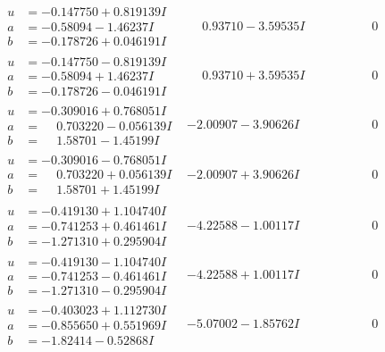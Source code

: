 \documentclass[1p]{elsarticle_modified}
\theoremstyle{definition}
\begin{document}
$$\begin{array}{c|c|c}
\begin{aligned}
u &= -0.147750 + 0.819139 I \\
a &= -0.58094 - 1.46237 I \\
b &= -0.178726 + 0.046191 I\end{aligned}
 & \phantom{-}0.93710 - 3.59535 I & \phantom{-0.000000 } 0 \\ \hline\begin{aligned}
u &= -0.147750 - 0.819139 I \\
a &= -0.58094 + 1.46237 I \\
b &= -0.178726 - 0.046191 I\end{aligned}
 & \phantom{-}0.93710 + 3.59535 I & \phantom{-0.000000 } 0 \\ \hline\begin{aligned}
u &= -0.309016 + 0.768051 I \\
a &= \phantom{-}0.703220 - 0.056139 I \\
b &= \phantom{-}1.58701 - 1.45199 I\end{aligned}
 & -2.00907 - 3.90626 I & \phantom{-0.000000 } 0 \\ \hline\begin{aligned}
u &= -0.309016 - 0.768051 I \\
a &= \phantom{-}0.703220 + 0.056139 I \\
b &= \phantom{-}1.58701 + 1.45199 I\end{aligned}
 & -2.00907 + 3.90626 I & \phantom{-0.000000 } 0 \\ \hline\begin{aligned}
u &= -0.419130 + 1.104740 I \\
a &= -0.741253 + 0.461461 I \\
b &= -1.271310 + 0.295904 I\end{aligned}
 & -4.22588 - 1.00117 I & \phantom{-0.000000 } 0 \\ \hline\begin{aligned}
u &= -0.419130 - 1.104740 I \\
a &= -0.741253 - 0.461461 I \\
b &= -1.271310 - 0.295904 I\end{aligned}
 & -4.22588 + 1.00117 I & \phantom{-0.000000 } 0 \\ \hline\begin{aligned}
u &= -0.403023 + 1.112730 I \\
a &= -0.855650 + 0.551969 I \\
b &= -1.82414 - 0.52868 I\end{aligned}
 & -5.07002 - 1.85762 I & \phantom{-0.000000 } 0 \\ \hline\begin{aligned}

\end{aligned}
\end{array}$$
\end{document}
